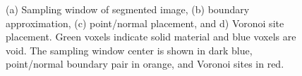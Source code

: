 \begin{figure}[ht]
{\label{fig:vor2}}
%
\caption{(a) Sampling window of segmented image, (b) boundary approximation, (c) point/normal placement, and d) Voronoi site placement. Green voxels indicate solid material and blue voxels are void. The sampling window center is shown in dark blue, point/normal boundary pair in orange, and Voronoi sites in red.}
\label{fig:vor}
\end{figure}

